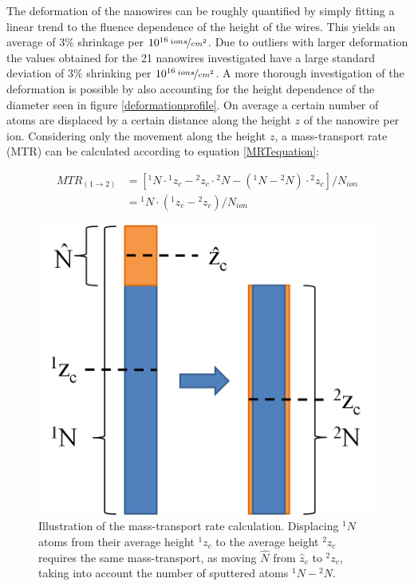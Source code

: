 The deformation of the nanowires can be roughly quantified by simply fitting a linear trend to the fluence dependence of the height of the wires. This yields an average of $3\%$ shrinkage per $10^{16}\,\nicefrac{ions}{cm^2}$. Due to outliers with larger deformation the values obtained for the 21 nanowires investigated have a large standard deviation of $3\%$ shrinking per $10^{16}\,\nicefrac{ions}{cm^2}$. A more thorough investigation of the deformation is possible by also accounting for the height dependence of the diameter seen in figure \ref{deformationprofile}. On average a certain number of atoms are displaced by a certain distance along the height $z$ of the nanowire per ion. Considering only the movement along the height $z$, a mass-transport rate (MTR) can be calculated according to equation \ref{MRTequation}:

\begin{equation}  
\begin{split}
    MTR_{(1 \rightarrow 2)} & = [ {}^{1}N\cdot {}^{1}z_{c} -{}^{2}z_{c} \cdot {}^{2}N - ({}^{1}N - {}^{2}N) \cdot {}^{2}z_{c}]/N_{ion} \\
		& = {}^{1}N \cdot ({}^{1}z_{c} - {}^{2}z_{c})/N_{ion} 
	\label{MRTequation}
	\end{split}
\end{equation}

\begin{figure}
	\centering
		\includegraphics[width=.3\textwidth]{images/MTRillustration.png}
	\caption{Illustration of the mass-transport rate calculation. Displacing ${}^{1}N$ atoms from their average height ${}^{1}z_{c}$ to the average height ${}^{2}z_{c}$ requires the same mass-transport, as moving $\hat{N}$ from $\hat{z}_c$ to ${}^{2}z_{c}$, taking into account the number of sputtered atoms ${}^{1}N-{}^{2}N$.}
	\label{MTRillustration}
\end{figure}

